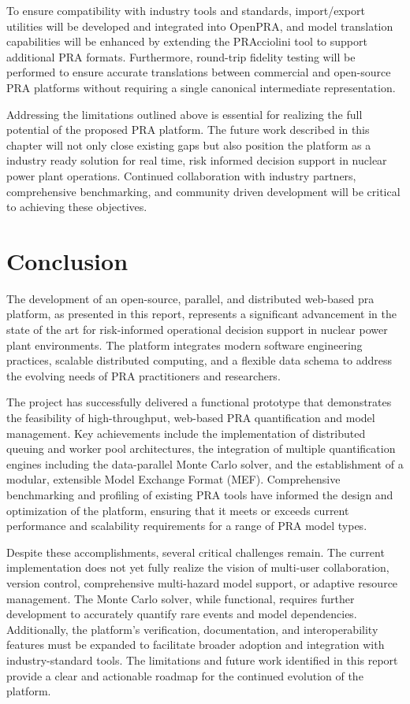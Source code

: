 To ensure compatibility with industry tools and standards, import/export utilities will be developed and integrated into OpenPRA, and model translation capabilities will be enhanced by extending the PRAcciolini tool to support additional PRA formats. Furthermore, round-trip fidelity testing will be performed to ensure accurate translations between commercial and open-source PRA platforms without requiring a single canonical intermediate representation.

Addressing the limitations outlined above is essential for realizing the full potential of the proposed PRA platform. The future work described in this chapter will not only close existing gaps but also position the platform as a industry ready solution for real time, risk informed decision support in nuclear power plant operations. Continued collaboration with industry partners, comprehensive benchmarking, and community driven development will be critical to achieving these objectives.

\section{Conclusion}

The development of an open-source, parallel, and distributed web-based \acrshort{pra} platform, as presented in this report, represents a significant advancement in the state of the art for risk-informed operational decision support in nuclear power plant environments. The platform integrates modern software engineering practices, scalable distributed computing, and a flexible data schema to address the evolving needs of PRA practitioners and researchers.

The project has successfully delivered a functional prototype that demonstrates the feasibility of high-throughput, web-based PRA quantification and model management. Key achievements include the implementation of distributed queuing and worker pool architectures, the integration of multiple quantification engines including the data-parallel Monte Carlo solver, and the establishment of a modular, extensible Model Exchange Format (MEF). Comprehensive benchmarking and profiling of existing PRA tools have informed the design and optimization of the platform, ensuring that it meets or exceeds current performance and scalability requirements for a range of PRA model types.

Despite these accomplishments, several critical challenges remain. The current implementation does not yet fully realize the vision of multi-user collaboration, version control, comprehensive multi-hazard model support, or adaptive resource management. The Monte Carlo solver, while functional, requires further development to accurately quantify rare events and model dependencies. Additionally, the platform's verification, documentation, and interoperability features must be expanded to facilitate broader adoption and integration with industry-standard tools. The limitations and future work identified in this report provide a clear and actionable roadmap for the continued evolution of the platform.

